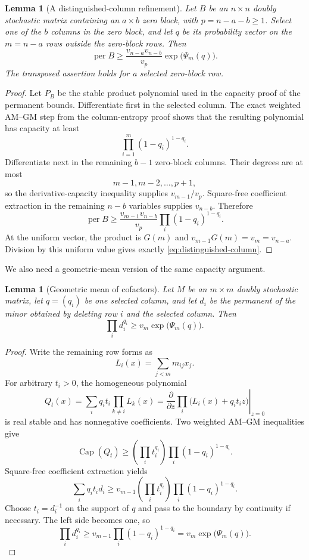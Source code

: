 \documentclass[11pt]{article}
\newtheorem{lemma}[theorem]{Lemma}
\theoremstyle{definition}
\DeclareMathOperator{\permop}{per}
\DeclareMathOperator{\capop}{Cap}
\begin{document}
\begin{lemma}[A distinguished-column refinement]\label{lem:distinguished-column}
Let $B$ be an $n\times n$ doubly stochastic matrix containing an
$a\times b$ zero block, with $p=n-a-b\ge1$.  Select one of the $b$ columns
in the zero block, and let $q$ be its probability vector on the
$m=n-a$ rows outside the zero-block rows.  Then
\begin{equation}\label{eq:distinguished-column}
 \permop B\ge
 \frac{v_{n-a}v_{n-b}}{v_p}\exp\bigl(\Psi_m(q)\bigr).
\end{equation}
The transposed assertion holds for a selected zero-block row.
\end{lemma}

\begin{proof}
Let $P_B$ be the stable product polynomial used in the capacity proof of the
permanent bounds.  Differentiate first in the selected column.  The exact
weighted AM--GM step from the column-entropy proof shows that the resulting
polynomial has capacity at least
\[
 \prod_{i=1}^m(1-q_i)^{1-q_i}.
\]
Differentiate next in the remaining $b-1$ zero-block columns.  Their degrees
are at most
\[
 m-1,m-2,\ldots,p+1,
\]
so the derivative-capacity inequality supplies $v_{m-1}/v_p$.  Square-free
coefficient extraction in the remaining $n-b$ variables supplies
$v_{n-b}$.  Therefore
\[
 \permop B\ge
 \frac{v_{m-1}v_{n-b}}{v_p}
 \prod_i(1-q_i)^{1-q_i}.
\]
At the uniform vector, the product is $G(m)$ and
$v_{m-1}G(m)=v_m=v_{n-a}$.  Division by this uniform value gives exactly
\eqref{eq:distinguished-column}.
\end{proof}

We also need a geometric-mean version of the same capacity argument.

\begin{lemma}[Geometric mean of cofactors]\label{lem:cofactor-geometric}
Let $M$ be an $m\times m$ doubly stochastic matrix, let
$q=(q_i)$ be one selected column, and let $d_i$ be the permanent of the
minor obtained by deleting row $i$ and the selected column.  Then
\begin{equation}\label{eq:cofactor-geometric}
 \prod_i d_i^{q_i}\ge v_m\exp\bigl(\Psi_m(q)\bigr).
\end{equation}
\end{lemma}

\begin{proof}
Write the remaining row forms as
\[
 L_i(x)=\sum_{j<m}m_{ij}x_j.
\]
For arbitrary $t_i>0$, the homogeneous polynomial
\[
 Q_t(x)=\sum_iq_it_i\prod_{k\ne i}L_k(x)
 =\left.\frac{\partial}{\partial z}
 \prod_i\bigl(L_i(x)+q_it_i z\bigr)\right|_{z=0}
\]
is real stable and has nonnegative coefficients.  Two weighted AM--GM
inequalities give
\[
 \capop(Q_t)\ge
 \left(\prod_i t_i^{q_i}\right)
 \prod_i(1-q_i)^{1-q_i}.
\]
Square-free coefficient extraction yields
\[
 \sum_iq_it_id_i\ge
 v_{m-1}\left(\prod_i t_i^{q_i}\right)
 \prod_i(1-q_i)^{1-q_i}.
\]
Choose $t_i=d_i^{-1}$ on the support of $q$ and pass to the boundary by
continuity if necessary.  The left side becomes one, so
\[
 \prod_i d_i^{q_i}\ge
 v_{m-1}\prod_i(1-q_i)^{1-q_i}
 =v_m\exp\bigl(\Psi_m(q)\bigr).
\]
\end{proof}
\end{document}
